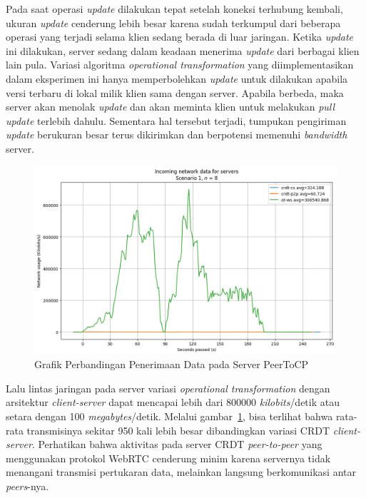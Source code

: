 Pada saat operasi \textit{update} dilakukan tepat setelah koneksi terhubung kembali, ukuran \textit{update} cenderung lebih besar karena sudah terkumpul dari beberapa operasi yang terjadi selama klien sedang berada di luar jaringan. Ketika \textit{update} ini dilakukan, server sedang dalam keadaan menerima \textit{update} dari berbagai klien lain pula. Variasi algoritma \textit{operational transformation} yang diimplementasikan dalam eksperimen ini hanya memperbolehkan \textit{update} untuk dilakukan apabila versi terbaru di lokal milik klien sama dengan server. Apabila berbeda, maka server akan menolak \textit{update} dan akan meminta klien untuk melakukan \textit{pull update} terlebih dahulu. Sementara hal tersebut terjadi, tumpukan pengiriman \textit{update} berukuran besar terus dikirimkan dan berpotensi memenuhi \textit{bandwidth} server.

\begin{figure}
 \centering
 \includegraphics[width=15cm]{./assets/skripsi/benchmark-vis_cell_2_output_24}
 \caption{Grafik Perbandingan Penerimaan Data pada Server PeerToCP}
 \label{fig:2-24}
\end{figure}

Lalu lintas jaringan pada server variasi \textit{operational transformation} dengan arsitektur \textit{client-server} dapat mencapai lebih dari 800000 \textit{kilobits}/detik atau setara dengan 100 \textit{megabytes}/detik. Melalui gambar~\ref{fig:2-24}, bisa terlihat bahwa rata-rata transmisinya sekitar 950 kali lebih besar dibandingkan variasi CRDT \textit{client-server}. Perhatikan bahwa aktivitas pada server CRDT \textit{peer-to-peer} yang menggunakan protokol WebRTC cenderung minim karena servernya tidak menangani transmisi pertukaran data, melainkan langsung berkomunikasi antar \textit{peers}-nya.

